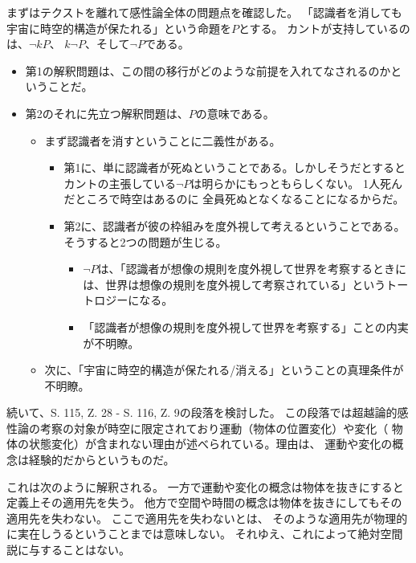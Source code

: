 \documentclass[12pt]{jsarticle}
\begin{document}
まずはテクストを離れて感性論全体の問題点を確認した。
「認識者を消しても宇宙に時空的構造が保たれる」という命題を$P$とする。
カントが支持しているのは、$\lnot kP$、
$k\lnot P$、そして$\lnot P$である。
\begin{itemize}
    \item 第1の解釈問題は、この間の移行がどのような前提を入れてなされるのかということだ。
    \item 第2のそれに先立つ解釈問題は、$P$の意味である。
    \begin{itemize}
        \item まず認識者を消すということに二義性がある。
        \begin{itemize}
            \item 第1に、単に認識者が死ぬということである。しかしそうだとするとカントの主張している$\lnot P$は明らかにもっともらしくない。
            1人死んだところで時空はあるのに
            全員死ぬとなくなることになるからだ。
            \item 第2に、認識者が彼の枠組みを度外視して考えるということである。そうすると2つの問題が生じる。
            \begin{itemize}
                \item $\lnot P$は、「認識者が想像の規則を度外視して世界を考察するときには、世界は想像の規則を度外視して考察されている」というトートロジーになる。
                \item 「認識者が想像の規則を度外視して世界を考察する」ことの内実が不明瞭。
        
            \end{itemize}
        \end{itemize}
        \item 次に、「宇宙に時空的構造が保たれる/消える」ということの真理条件が不明瞭。
    \end{itemize}
\end{itemize}

続いて、S. 115, Z. 28 - S. 116, Z. 9の段落を検討した。
この段落では超越論的感性論の考察の対象が時空に限定されており運動（物体の位置変化）や変化（
物体の状態変化）が含まれない理由が述べられている。理由は、
運動や変化の概念は経験的だからというものだ。

これは次のように解釈される。
一方で運動や変化の概念は物体を抜きにすると
定義上その適用先を失う。
他方で空間や時間の概念は物体を抜きにしてもその適用先を失わない。
ここで適用先を失わないとは、
そのような適用先が物理的に実在しうるということまでは意味しない。
それゆえ、これによって絶対空間説に与することはない。
\end{document}
